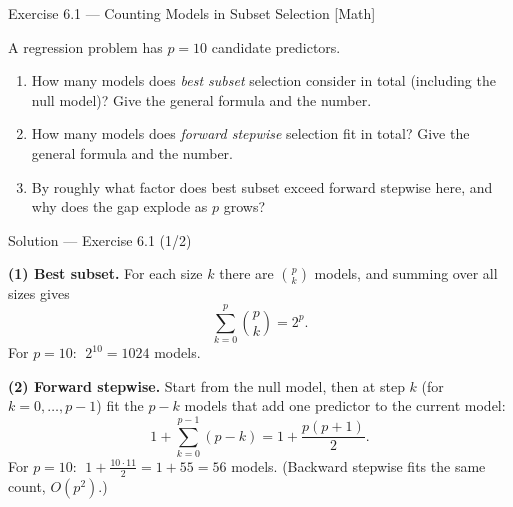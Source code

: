 \documentclass[aspectratio=169,11pt]{beamer}
\begin{document}
\begin{frame}{Exercise 6.1 --- Counting Models in Subset Selection [Math]}
  \begin{exercise}
    A regression problem has $p = 10$ candidate predictors.
    \begin{enumerate}
      \item How many models does \emph{best subset} selection consider
            in total (including the null model)? Give the general
            formula and the number.
      \item How many models does \emph{forward stepwise} selection fit
            in total? Give the general formula and the number.
      \item By roughly what factor does best subset exceed forward
            stepwise here, and why does the gap explode as $p$ grows?
    \end{enumerate}
  \end{exercise}
\end{frame}

\begin{frame}{Solution --- Exercise 6.1 (1/2)}
  \begin{solutionbox}
    \textbf{(1) Best subset.}
    For each size $k$ there are $\binom{p}{k}$ models, and summing over
    all sizes gives
    \[
      \sum_{k=0}^{p}\binom{p}{k} = 2^{p} .
    \]
    For $p = 10$: $\;2^{10} = 1024$ models.

    \textbf{(2) Forward stepwise.}
    Start from the null model, then at step $k$ (for
    $k = 0,\dots,p-1$) fit the $p - k$ models that add one predictor to
    the current model:
    \[
      1 + \sum_{k=0}^{p-1}(p-k) = 1 + \frac{p(p+1)}{2} .
    \]
    For $p = 10$: $\;1 + \tfrac{10\cdot 11}{2} = 1 + 55 = 56$ models.
    (Backward stepwise fits the same count, $O(p^2)$.)
  \end{solutionbox}
\end{frame}
\end{document}
